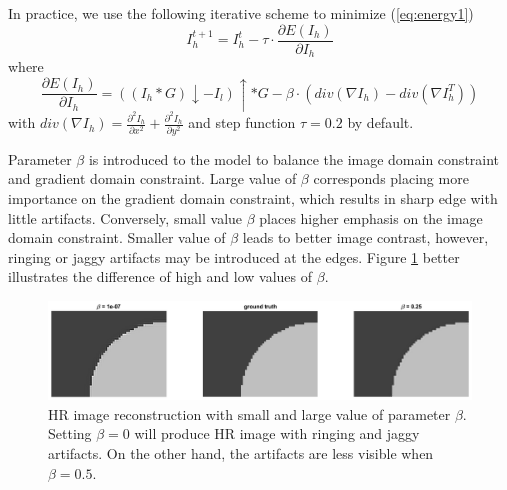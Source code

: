 \documentclass[a4paper,11pt]{article}
\begin{document}
In practice, we use the following iterative scheme to minimize (\ref{eq:energy1})
\begin{equation}
	I_h^{t+1} = I_h^t - \tau \cdot \frac{\partial E(I_h)}{\partial I_h}
\end{equation}
where
\begin{equation}
	\frac{\partial E(I_h)}{\partial I_h} = ((I_h \ast G) \downarrow - I_l) \uparrow \ast G - \beta \cdot (div(\nabla I_h) - div(\nabla I_h^T))
\end{equation}
 with $div(\nabla I_h) = \frac{\partial^2 I_h}{\partial x^2} + \frac{\partial^2 I_h}{\partial y^2}$ and step function $\tau =0.2$ by default.

Parameter $\beta$ is introduced to the model to balance the image domain constraint and gradient domain constraint. Large value of $\beta$ corresponds placing more importance on the gradient domain constraint, which results in sharp edge with little artifacts. Conversely, small value $\beta$ places higher emphasis on the image domain constraint. Smaller value of $\beta$ leads to better image contrast, however, ringing or jaggy artifacts may be introduced at the edges. Figure \ref{fig:beta2} better illustrates the difference of high and low values of $\beta$.

\begin{figure}[H]
	\centering
	\includegraphics[width=1\textwidth]{large small beta.png}
	\caption{HR image reconstruction with small and large value of parameter $\beta$. Setting $\beta = 0$ will produce HR image with ringing and jaggy artifacts. On the other hand, the artifacts are less visible when $\beta = 0.5$.}
	\label{fig:beta2}
\end{figure}
 
\end{document}
